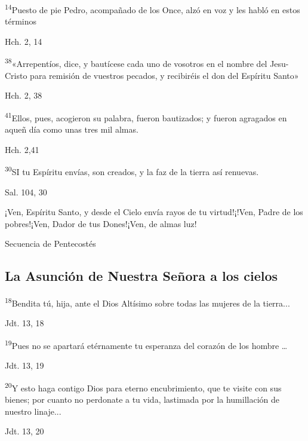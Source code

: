 \documentclass[a4paper,11pt]{article}
\begin{document}
      \textsuperscript{14}Puesto de pie Pedro, acompañado de los Once, alzó en voz y les habló en estos términos
      \begin{flushright}
        Hch. 2, 14
      \end{flushright}

      \textsuperscript{38}«Arrepentíos, dice, y bautícese cada uno de vosotros en el nombre del Jesu-Cristo para remisión de vuestros pecados, y recibiréis el don
      del Espíritu Santo»
      \begin{flushright}
        Hch. 2, 38
      \end{flushright}

      \textsuperscript{41}Ellos, pues, acogieron su palabra, fueron bautizados; y fueron agragados en aqueñ día como unas tres mil almas.
      \begin{flushright}
        Hch. 2,41
      \end{flushright}

      \textsuperscript{30}SI tu Espíritu envías, son creados, y la faz de la tierra así renuevas.
      \begin{flushright}
        Sal. 104, 30
      \end{flushright}

      ¡Ven, Espíritu Santo, y desde el Cielo envía rayos de tu virtud!¡!Ven, Padre de los pobres!¡Ven, Dador de tus Dones!¡Ven, de almas luz!
      \begin{flushright}
        Secuencia de Pentecostés
      \end{flushright}

    \subsection*{\hfil La Asunción de Nuestra Señora a los cielos \hfil}

      \textsuperscript{18}Bendita tú, hija, ante el Dios Altísimo sobre todas las mujeres de la tierra...
      \begin{flushright}
        Jdt. 13, 18
      \end{flushright}

      \textsuperscript{19}Pues no se apartará etérnamente tu esperanza del corazón de los hombre \ldots
      \begin{flushright}
        Jdt. 13, 19
      \end{flushright}

      \textsuperscript{20}Y esto haga contigo Dios para eterno encubrimiento, que te visite con sus bienes; por cuanto no perdonate
      a tu vida, lastimada por la humillación de nuestro linaje...
      \begin{flushright}
        Jdt. 13, 20
      \end{flushright}
\end{document}
